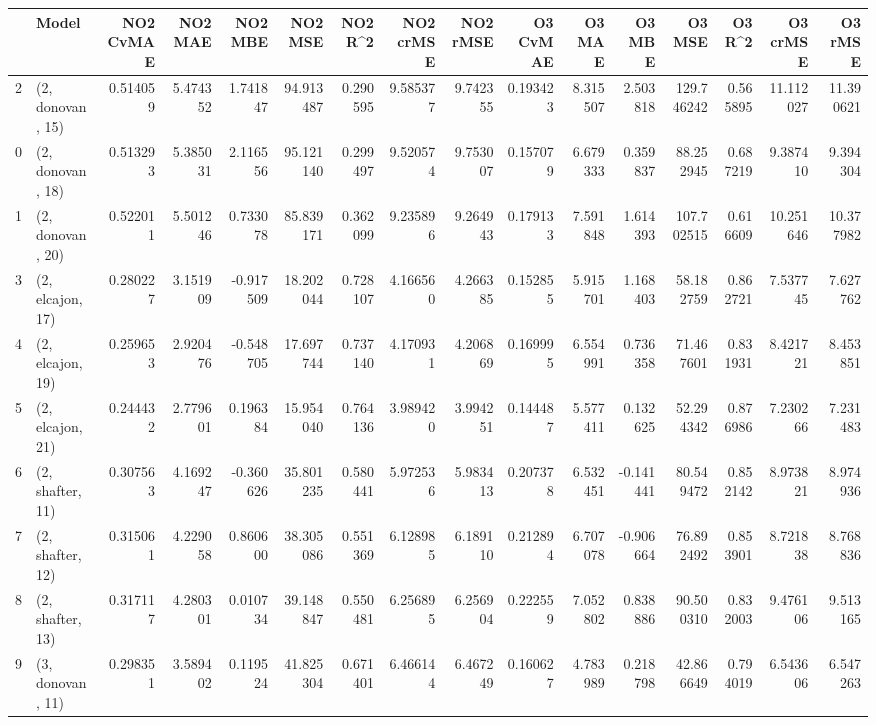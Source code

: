 \begin{tabular}{llrrrrrrrrrrrrrr}
\toprule
{} &             Model &  NO2 CvMAE &   NO2 MAE &   NO2 MBE &    NO2 MSE &   NO2 R\textasciicircum2 &  NO2 crMSE &  NO2 rMSE &  O3 CvMAE &    O3 MAE &    O3 MBE &      O3 MSE &    O3 R\textasciicircum2 &   O3 crMSE &    O3 rMSE \\
\midrule
2  &  (2, donovan, 15) &   0.514059 &  5.474352 &  1.741847 &  94.913487 &  0.290595 &   9.585377 &  9.742355 &  0.193423 &  8.315507 &  2.503818 &  129.746242 &  0.565895 &  11.112027 &  11.390621 \\
0  &  (2, donovan, 18) &   0.513293 &  5.385031 &  2.116556 &  95.121140 &  0.299497 &   9.520574 &  9.753007 &  0.157079 &  6.679333 &  0.359837 &   88.252945 &  0.687219 &   9.387410 &   9.394304 \\
1  &  (2, donovan, 20) &   0.522011 &  5.501246 &  0.733078 &  85.839171 &  0.362099 &   9.235896 &  9.264943 &  0.179133 &  7.591848 &  1.614393 &  107.702515 &  0.616609 &  10.251646 &  10.377982 \\
3  &  (2, elcajon, 17) &   0.280227 &  3.151909 & -0.917509 &  18.202044 &  0.728107 &   4.166560 &  4.266385 &  0.152855 &  5.915701 &  1.168403 &   58.182759 &  0.862721 &   7.537745 &   7.627762 \\
4  &  (2, elcajon, 19) &   0.259653 &  2.920476 & -0.548705 &  17.697744 &  0.737140 &   4.170931 &  4.206869 &  0.169995 &  6.554991 &  0.736358 &   71.467601 &  0.831931 &   8.421721 &   8.453851 \\
5  &  (2, elcajon, 21) &   0.244432 &  2.779601 &  0.196384 &  15.954040 &  0.764136 &   3.989420 &  3.994251 &  0.144487 &  5.577411 &  0.132625 &   52.294342 &  0.876986 &   7.230266 &   7.231483 \\
6  &  (2, shafter, 11) &   0.307563 &  4.169247 & -0.360626 &  35.801235 &  0.580441 &   5.972536 &  5.983413 &  0.207378 &  6.532451 & -0.141441 &   80.549472 &  0.852142 &   8.973821 &   8.974936 \\
7  &  (2, shafter, 12) &   0.315061 &  4.229058 &  0.860600 &  38.305086 &  0.551369 &   6.128985 &  6.189110 &  0.212894 &  6.707078 & -0.906664 &   76.892492 &  0.853901 &   8.721838 &   8.768836 \\
8  &  (2, shafter, 13) &   0.317117 &  4.280301 &  0.010734 &  39.148847 &  0.550481 &   6.256895 &  6.256904 &  0.222559 &  7.052802 &  0.838886 &   90.500310 &  0.832003 &   9.476106 &   9.513165 \\
9  &  (3, donovan, 11) &   0.298351 &  3.589402 &  0.119524 &  41.825304 &  0.671401 &   6.466144 &  6.467249 &  0.160627 &  4.783989 &  0.218798 &   42.866649 &  0.794019 &   6.543606 &   6.547263 \\

\end{tabular}
